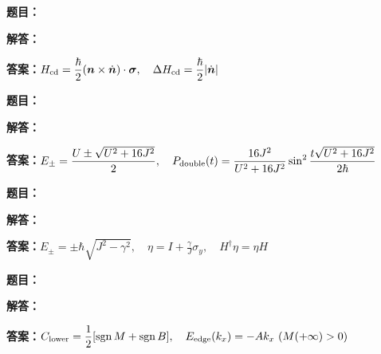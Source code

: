 \documentclass[lang=cn,color=blue,11pt]{elegantbook}
\begin{document}
\par\smallskip\noindent\hrulefill\par\medskip
{}\par
\noindent\textbf{题目：}
\par\noindent\textbf{解答：}
\par\noindent\textbf{答案：}\(\displaystyle H_{\rm cd}=\frac{\hbar}{2}(\boldsymbol n\times\dot{\boldsymbol n})\cdot\boldsymbol\sigma,\quad \Delta H_{\rm cd}=\frac{\hbar}2|\dot{\boldsymbol n}|\)\par
\par\smallskip\noindent\hrulefill\par\medskip
{}\par
\noindent\textbf{题目：}
\par\noindent\textbf{解答：}
\par\noindent\textbf{答案：}\(\displaystyle E_\pm=\frac{U\pm\sqrt{U^2+16J^2}}2,\quad P_{\rm double}(t)=\frac{16J^2}{U^2+16J^2}\sin^2\frac{t\sqrt{U^2+16J^2}}{2\hbar}\)\par
\par\smallskip\noindent\hrulefill\par\medskip
{}\par
\noindent\textbf{题目：}
\par\noindent\textbf{解答：}
\par\noindent\textbf{答案：}\(\displaystyle E_\pm=\pm\hbar\sqrt{J^2-\gamma^2},\quad \eta=I+\frac{\gamma}{J}\sigma_y,\quad H^\dagger\eta=\eta H\)\par
\par\smallskip\noindent\hrulefill\par\medskip
{}\par
\noindent\textbf{题目：}
\par\noindent\textbf{解答：}
\par\noindent\textbf{答案：}\(\displaystyle C_{\rm lower}=\frac12[\operatorname{sgn}M+\operatorname{sgn}B],\quad E_{\rm edge}(k_x)=-Ak_x\ (M(+\infty)>0)\)\par
\end{document}

